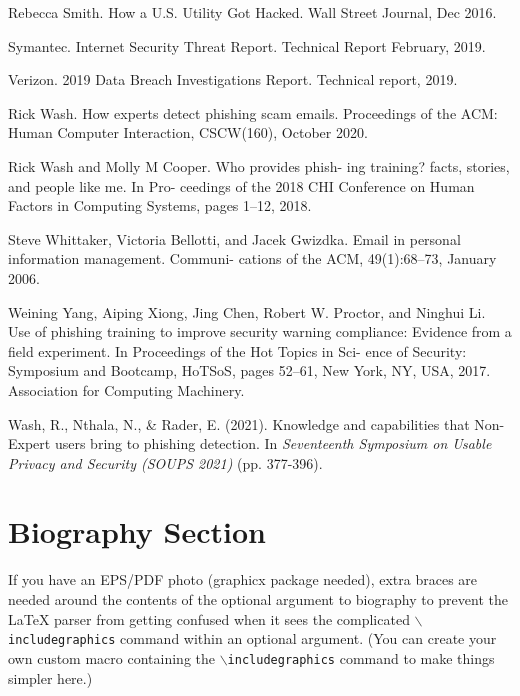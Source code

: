 \documentclass[lettersize,journal]{IEEEtran}
\begin{document}
\begin{thebibliography}{1}
  Rebecca Smith. How a U.S. Utility Got Hacked. Wall Street Journal, Dec 2016.

  Symantec. Internet Security Threat Report. Technical Report February, 2019.

  Verizon. 2019 Data Breach Investigations Report. Technical report, 2019.

  Rick Wash. How experts detect phishing scam emails. Proceedings of the ACM: Human Computer Interaction, CSCW(160), October 2020.

  Rick Wash and Molly M Cooper. Who provides phish-
  ing training? facts, stories, and people like me. In Pro-
  ceedings of the 2018 CHI Conference on Human Factors
  in Computing Systems, pages 1–12, 2018.

  Steve Whittaker, Victoria Bellotti, and Jacek Gwizdka.
  Email in personal information management. Communi-
  cations of the ACM, 49(1):68–73, January 2006.

  Weining Yang, Aiping Xiong, Jing Chen, Robert W.
  Proctor, and Ninghui Li. Use of phishing training to
  improve security warning compliance: Evidence from a
  field experiment. In Proceedings of the Hot Topics in Sci-
  ence of Security: Symposium and Bootcamp, HoTSoS,
  pages 52–61, New York, NY, USA, 2017. Association
  for Computing Machinery.

  Wash, R., Nthala, N., & Rader, E. (2021). Knowledge and capabilities that {Non-Expert} users bring to phishing detection. In \textit{Seventeenth Symposium on Usable Privacy and Security (SOUPS 2021)} (pp. 377-396).

\end{thebibliography}

\newpage

\section{Biography Section}
If you have an EPS/PDF photo (graphicx package needed), extra braces are needed
around the contents of the optional argument to biography to prevent the LaTeX
parser from getting confused when it sees the complicated
$\backslash${\tt{includegraphics}} command within an optional argument. (You
can create your own custom macro containing the
$\backslash${\tt{includegraphics}} command to make things simpler here.)

\vspace{11pt}
\end{document}
